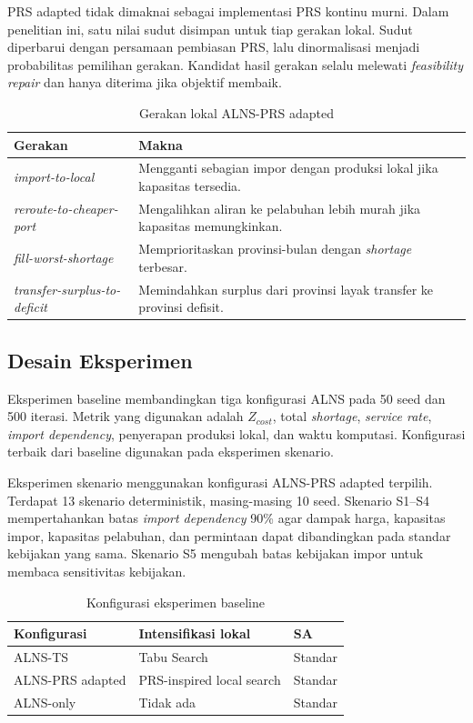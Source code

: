 \documentclass[journal]{IEEEtran}
\theoremstyle{definition}
\theoremstyle{definition}
\theoremstyle{plain}
\begin{document}
    PRS adapted tidak dimaknai sebagai implementasi PRS kontinu murni. Dalam penelitian ini, satu nilai sudut disimpan untuk tiap gerakan lokal. Sudut diperbarui dengan persamaan pembiasan PRS, lalu dinormalisasi menjadi probabilitas pemilihan gerakan. Kandidat hasil gerakan selalu melewati \textit{feasibility repair} dan hanya diterima jika objektif membaik.

    \begin{table}[H]
    \centering
    \caption{Gerakan lokal ALNS-PRS adapted}
    \label{tab:prs_moves}
    \begin{tabularx}{\columnwidth}{lX}
    \toprule
    \textbf{Gerakan} & \textbf{Makna} \\
    \midrule
    \textit{import-to-local} & Mengganti sebagian impor dengan produksi lokal jika kapasitas tersedia. \\
    \textit{reroute-to-cheaper-port} & Mengalihkan aliran ke pelabuhan lebih murah jika kapasitas memungkinkan. \\
    \textit{fill-worst-shortage} & Memprioritaskan provinsi-bulan dengan \textit{shortage} terbesar. \\
    \textit{transfer-surplus-to-deficit} & Memindahkan surplus dari provinsi layak transfer ke provinsi defisit. \\
    \bottomrule
    \end{tabularx}
    \end{table}

    \subsection{Desain Eksperimen}
    Eksperimen baseline membandingkan tiga konfigurasi ALNS pada 50 seed dan 500 iterasi. Metrik yang digunakan adalah $Z_{cost}$, total \textit{shortage}, \textit{service rate}, \textit{import dependency}, penyerapan produksi lokal, dan waktu komputasi. Konfigurasi terbaik dari baseline digunakan pada eksperimen skenario.

    Eksperimen skenario menggunakan konfigurasi ALNS-PRS adapted terpilih. Terdapat 13 skenario deterministik, masing-masing 10 seed. Skenario S1--S4 mempertahankan batas \textit{import dependency} 90\% agar dampak harga, kapasitas impor, kapasitas pelabuhan, dan permintaan dapat dibandingkan pada standar kebijakan yang sama. Skenario S5 mengubah batas kebijakan impor untuk membaca sensitivitas kebijakan.

    \begin{table}[H]
    \centering
    \caption{Konfigurasi eksperimen baseline}
    \label{tab:baseline_config}
    \begin{tabular}{lll}
    \toprule
    \textbf{Konfigurasi} & \textbf{Intensifikasi lokal} & \textbf{SA} \\
    \midrule
    ALNS-TS & Tabu Search & Standar \\
    ALNS-PRS adapted & PRS-inspired local search & Standar \\
    ALNS-only & Tidak ada & Standar \\
    \bottomrule
    \end{tabular}
    \end{table}
\end{document}
